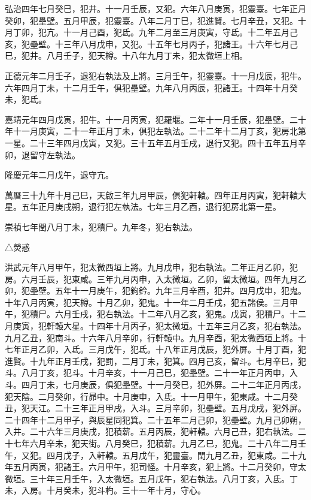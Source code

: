 \begin{pinyinscope}
弘治四年七月癸巳，犯井。十一月壬辰，又犯。六年八月庚寅，犯靈臺。七年正月癸卯，犯壘壁。五月甲辰，犯靈臺。八年二月丁巳，犯進賢。七月辛丑，又犯。十月丁卯，犯亢。十一月己酉，犯氐。九年二月至三月庚寅，守氐。十二年五月己亥，犯壘壁。十三年八月戊申，又犯。十五年七月丙子，犯諸王。十六年七月己巳，犯井。八月壬子，犯天樽。十八年九月丁未，犯太微垣上相。

正德元年二月壬子，退犯右執法及上將。三月壬午，犯靈臺。十一月戊辰，犯牛。六年四月丁未，十二月壬午，俱犯壘壁。九年八月丙辰，犯諸王。十四年十月癸未，犯氐。

嘉靖元年四月戊寅，犯牛。十一月丙寅，犯羅堰。二年十一月壬辰，犯壘壁。二十年十一月庚寅，二十一年正月丁未，俱犯左執法。二十二年十二月丁亥，犯房北第一星。二十三年四月戊寅，又犯。三十五年五月壬戌，退行又犯。四十五年五月辛卯，退留守左執法。

隆慶元年二月戊午，退守亢。

萬曆三十九年十月己巳，天啟三年九月甲辰，俱犯軒轅。四年正月丙寅，犯軒轅大星。五年正月庚戌朔，退行犯左執法。七年三月乙酉，退行犯房北第一星。

崇禎七年閏八月丁未，犯積尸。九年冬，犯右執法。

△熒惑

洪武元年八月甲午，犯太微西垣上將。九月戊申，犯右執法。二年正月乙卯，犯房。六月壬辰，犯東咸。三年九月丙申，入太微垣。乙卯，留太微垣。四年九月乙卯，犯壘壁。五年十一月庚午，犯鉤鈐。九年三月辛酉，犯井。四月戊申，犯鬼。十年八月丙寅，犯天樽。十月乙卯，犯鬼。十一年二月壬戌，犯五諸侯。三月甲午，犯積尸。六月壬戌，犯右執法。十二年八月乙亥，犯鬼。戊寅，犯積尸。十二月庚寅，犯軒轅大星。十四年十月丙子，犯太微垣。十五年三月乙亥，犯右執法。九月乙丑，犯南斗。十六年八月辛卯，行軒轅中。九月辛酉，犯太微西垣上將。十七年正月乙卯，入氐。三月戊午，犯氐。十八年正月戊辰，犯外屏。十月丁酉，犯進賢。十九年正月壬戌，犯罰，二月丁未，犯箕。四月己亥，留斗。七月辛巳，犯斗。八月丁亥，犯斗。十月辛亥，十一月己巳，犯壘壁。二十一年正月丙申，入斗。四月丁未，七月庚辰，俱犯壘壁。十一月癸巳，犯外屏。二十二年正月丙戌，犯天陰。二月癸卯，行昴中。十月庚申，入氐。十一月甲午，犯東咸。十二月癸丑，犯天江。二十三年正月甲戌，入斗。三月辛卯，犯壘壁。五月戊戌，犯外屏。二十四年十二月甲子，與辰星同犯箕。二十五年二月己卯，犯壘壁。九月己卯朔，入井。二十六年三月庚戌，犯積薪。五月丙辰，犯軒轅。六月己丑，犯右執法。二十七年六月辛未，犯天街。八月癸巳，犯積薪。九月乙巳，犯鬼。二十八年二月壬午，又犯。四月戊子，入軒轅。五月戊午，犯靈臺。閏九月乙丑，犯東咸。二十九年五月丙寅，犯諸王。六月甲午，犯司怪。十月辛亥，犯上將。十二月癸卯，守太微垣。三十年三月壬午，入太微垣。五月戊午，犯右執法。八月丁亥，入氐。丁未，入房。十月癸未，犯斗杓。三十一年十月，守心。


\end{pinyinscope}
